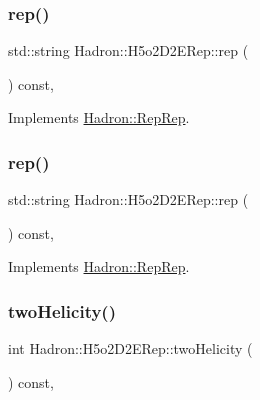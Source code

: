 \subsubsection{\texorpdfstring{rep()}{rep()}\hspace{0.1cm}{\footnotesize\ttfamily [4/5]}}
{\footnotesize\ttfamily std\+::string Hadron\+::\+H5o2\+D2\+E\+Rep\+::rep (\begin{DoxyParamCaption}{ }\end{DoxyParamCaption}) const\hspace{0.3cm}{\ttfamily [inline]}, {\ttfamily [virtual]}}



Implements \mbox{\hyperlink{structHadron_1_1RepRep_ab3213025f6de249f7095892109575fde}{Hadron\+::\+Rep\+Rep}}.

\mbox{\label{structHadron_1_1H5o2D2ERep_a114f378ebe8c306a6530f530da8ac8d1}} 
\subsubsection{\texorpdfstring{rep()}{rep()}\hspace{0.1cm}{\footnotesize\ttfamily [5/5]}}
{\footnotesize\ttfamily std\+::string Hadron\+::\+H5o2\+D2\+E\+Rep\+::rep (\begin{DoxyParamCaption}{ }\end{DoxyParamCaption}) const\hspace{0.3cm}{\ttfamily [inline]}, {\ttfamily [virtual]}}



Implements \mbox{\hyperlink{structHadron_1_1RepRep_ab3213025f6de249f7095892109575fde}{Hadron\+::\+Rep\+Rep}}.

\mbox{\label{structHadron_1_1H5o2D2ERep_a8a929124bb0b88a9f8c8c8a04e633baa}} 
\subsubsection{\texorpdfstring{twoHelicity()}{twoHelicity()}\hspace{0.1cm}{\footnotesize\ttfamily [1/3]}}
{\footnotesize\ttfamily int Hadron\+::\+H5o2\+D2\+E\+Rep\+::two\+Helicity (\begin{DoxyParamCaption}{ }\end{DoxyParamCaption}) const\hspace{0.3cm}{\ttfamily [inline]}, {\ttfamily [virtual]}}

